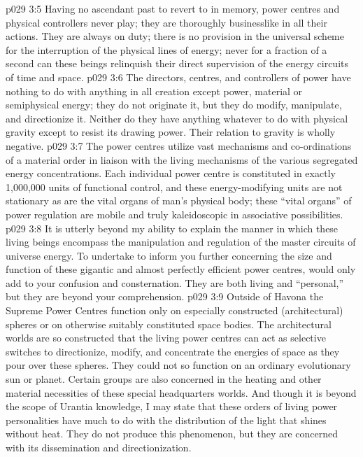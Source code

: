 \vs p029 3:5 Having no ascendant past to revert to in memory, power centres and physical controllers never play; they are thoroughly businesslike in all their actions. They are always on duty; there is no provision in the universal scheme for the interruption of the physical lines of energy; never for a fraction of a second can these beings relinquish their direct supervision of the energy circuits of time and space.
\vs p029 3:6 \pc The directors, centres, and controllers of power have nothing to do with anything in all creation except power, material or semiphysical energy; they do not originate it, but they do modify, manipulate, and directionize it. Neither do they have anything whatever to do with physical gravity except to resist its drawing power. Their relation to gravity is wholly negative.
\vs p029 3:7 The power centres utilize vast mechanisms and co\hyp{}ordinations of a material order in liaison with the living mechanisms of the various segregated energy concentrations. Each individual power centre is constituted in exactly 1,000,000 units of functional control, and these energy\hyp{}modifying units are not stationary as are the vital organs of man’s physical body; these “vital organs” of power regulation are mobile and truly kaleidoscopic in associative possibilities.
\vs p029 3:8 It is utterly beyond my ability to explain the manner in which these living beings encompass the manipulation and regulation of the master circuits of universe energy. To undertake to inform you further concerning the size and function of these gigantic and almost perfectly efficient power centres, would only add to your confusion and consternation. They are both living and “personal,” but they are beyond your comprehension.
\vs p029 3:9 \pc Outside of Havona the Supreme Power Centres function only on especially constructed (architectural) spheres or on otherwise suitably constituted space bodies. The architectural worlds are so constructed that the living power centres can act as selective switches to directionize, modify, and concentrate the energies of space as they pour over these spheres. They could not so function on an ordinary evolutionary sun or planet. Certain groups are also concerned in the heating and other material necessities of these special headquarters worlds. And though it is beyond the scope of Urantia knowledge, I may state that these orders of living power personalities have much to do with the distribution of the light that shines without heat. They do not produce this phenomenon, but they are concerned with its dissemination and directionization.

